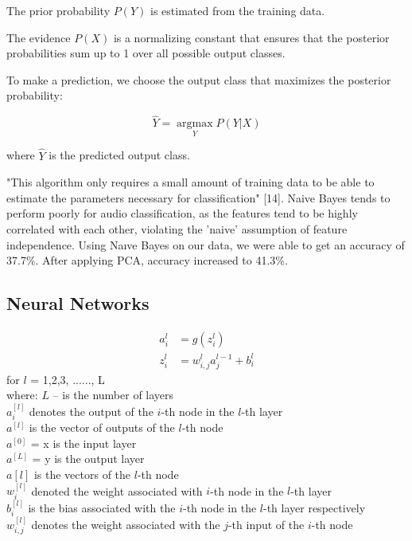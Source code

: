 \documentclass[conference]{IEEEtran}
\begin{document}
The prior probability $P(Y)$ is estimated from the training data.

The evidence $P(X)$ is a normalizing constant that ensures that the posterior probabilities sum up to 1 over all possible output classes.

To make a prediction, we choose the output class that maximizes the posterior probability:

\begin{equation}
\hat{Y} = \operatorname*{argmax}_{Y} P(Y|X)
\end{equation}

where $\hat{Y}$ is the predicted output class.

"This algorithm only requires a small amount of training data to be able to estimate the parameters necessary for classification" [14].
Naive Bayes tends to perform poorly for audio classification, as the features tend to be highly correlated with each other, violating the ’naive’ assumption of feature independence. Using Naıve Bayes on our data, we were able to get an accuracy of 37.7\%. After applying PCA, accuracy increased to 41.3\%.


\subsection{Neural Networks}
\begin{align*}
a_i^{l} &= g(z_i^{l}) \\
z_i^{l} &=w_{i,j}^{l} a_j^{l-1} + b_i^{l} 
\end{align*}
for $l$ = 1,2,3, ......, L \\
where:
$L$ – is the number of layers \\
$a_i^{[l]}$ denotes the output of the $i$-th node in the $l$-th layer\\
$a^{[l]}$ is the vector of outputs of the $l$-th node\\
$a^{[0]}$ = x is the input layer\\
$a^{[L]}$ = y is the output layer\\
$a{[l]}$ is the vectors of the $l$-th node\\
$w_i^{[l]}$ denoted the weight associated with $i$-th node in the $l$-th layer \\
$b_i^{[l]}$ is the bias associated with the $i$-th node in the $l$-th layer respectively\\
$w_{i,j}^{[l]}$ denotes the weight associated with the $j$-th input of the $i$-th node \\
\end{document}

